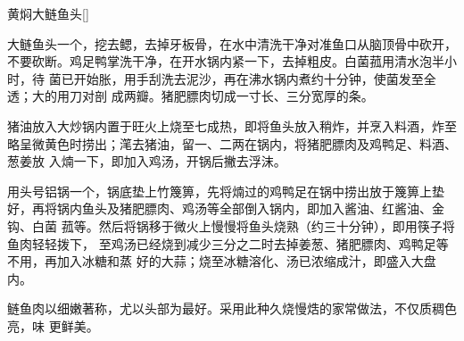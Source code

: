 \begin{recipe}{黄焖大鲢鱼头}[\footnotemark]

\ingredients


\preparation

\step 大鲢鱼头一个，挖去鳃，去掉牙板骨，在水中清洗干净对准鱼口从脑顶骨中砍开，
不要砍断。鸡足鸭掌洗干净，在开水锅内紧一下，去掉粗皮。白菌菰用清水泡半小时，待
菌已开始胀，用手刮洗去泥沙，再在沸水锅内煮约十分钟，使菌发至全透；大的用刀对剖
成两瓣。猪肥膘肉切成一寸长、三分宽厚的条。

\step 猪油放入大炒锅内置于旺火上烧至七成热，即将鱼头放入稍炸，并烹入料酒，炸至
略呈微黄色时捞出；滗去猪油，留一、二两在锅内，将猪肥膘肉及鸡鸭足、料酒、葱姜放
入煵一下，即加入鸡汤，开锅后撇去浮沫。

\step 用头号铝锅一个，锅底垫上竹篾箅，先将煵过的鸡鸭足在锅中捞出放于篾箅上垫
好，再将锅内鱼头及猪肥膘肉、鸡汤等全部倒入锅内，即加入酱油、红酱油、金钩、白菌
菰等。然后将锅移于微火上慢慢将鱼头烧熟（约三十分钟），即用筷子将鱼肉轻轻拨下，
至鸡汤已经烧到减少三分之二时去掉姜葱、猪肥膘肉、鸡鸭足等不用，再加入冰糖和蒸
好的大蒜；烧至冰糖溶化、汤已浓缩成汁，即盛入大盘内。

\features

鲢鱼肉以细嫩著称，尤以头部为最好。采用此种久烧慢焅的家常做法，不仅质稠色亮，味
更鲜美。


\end{recipe}

